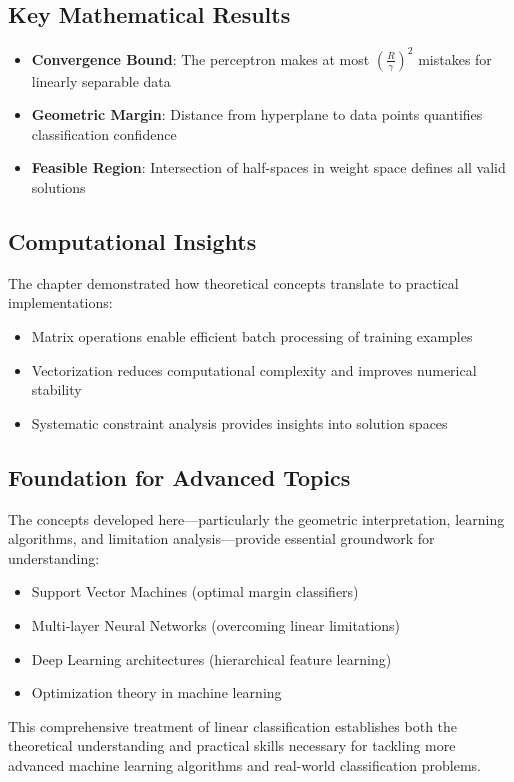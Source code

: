 \subsection{Key Mathematical Results}
\begin{itemize}
    \item \textbf{Convergence Bound}: The perceptron makes at most $\left(\frac{R}{\gamma}\right)^2$ mistakes for linearly separable data
    \item \textbf{Geometric Margin}: Distance from hyperplane to data points quantifies classification confidence
    \item \textbf{Feasible Region}: Intersection of half-spaces in weight space defines all valid solutions
\end{itemize}

\subsection{Computational Insights}
The chapter demonstrated how theoretical concepts translate to practical implementations:
\begin{itemize}
    \item Matrix operations enable efficient batch processing of training examples
    \item Vectorization reduces computational complexity and improves numerical stability
    \item Systematic constraint analysis provides insights into solution spaces
\end{itemize}

\subsection{Foundation for Advanced Topics}
The concepts developed here—particularly the geometric interpretation, learning algorithms, and limitation analysis—provide essential groundwork for understanding:
\begin{itemize}
    \item Support Vector Machines (optimal margin classifiers)
    \item Multi-layer Neural Networks (overcoming linear limitations)
    \item Deep Learning architectures (hierarchical feature learning)
    \item Optimization theory in machine learning
\end{itemize}

This comprehensive treatment of linear classification establishes both the theoretical understanding and practical skills necessary for tackling more advanced machine learning algorithms and real-world classification problems.